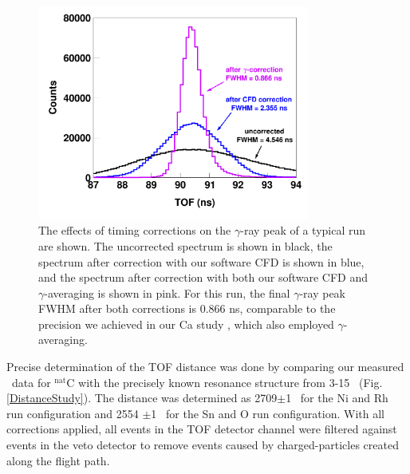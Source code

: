 \begin{figure}[tb]
    \centering
    \includegraphics[width=0.8\textwidth]{figures/TimeCorrections.png}
    \caption[Improving timing precision with a software CFD and $\gamma$-ray averaging]
    {The effects of timing corrections on the $\gamma$-ray
        peak of a typical run are shown. The uncorrected spectrum is shown in black,
        the spectrum after correction with our software CFD is shown in blue,
        and the spectrum after correction with both our software CFD and
        $\gamma$-averaging is 
        shown in pink. For this run, the final $\gamma$-ray peak 
        FWHM after both corrections is 0.866 ns, comparable to the precision we
        achieved in our Ca study \cite{Shane2010}, which also employed $\gamma$-
        averaging.}
    \label{TimingCorrectionStudy}
\end{figure}

Precise determination of the TOF distance was done by comparing our measured \tot\ data
for $^{\text{nat}}$C with the precisely known resonance structure from
3-15 \mega\electronvolt\ (Fig. \ref{DistanceStudy}).
The distance was determined as 2709$\pm$1 \centi\meter\ for the
Ni and Rh run configuration and 2554 $\pm$1 \centi\meter\ for
the Sn and O run configuration. With all corrections applied, all events in the 
TOF detector channel were filtered against events in the veto detector to remove
events caused by charged-particles created along the flight path.

